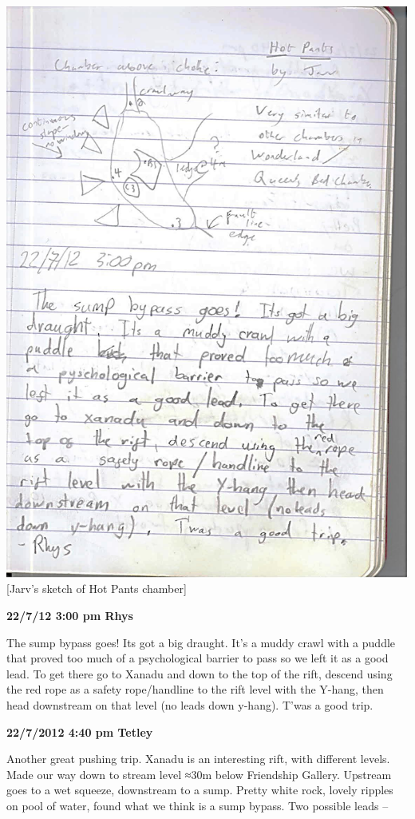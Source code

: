 \includegraphics{UgLog1012/70.jpeg}\\
{[}Jarv's sketch of Hot Pants chamber{]}

\textbf{22/7/12 3:00 pm Rhys}

The sump bypass goes! Its got a big draught. It's a muddy crawl with a
puddle that proved too much of a psychological barrier to pass so we
left it as a good lead. To get there go to Xanadu and down to the top of
the rift, descend using the red rope as a safety rope/handline to the
rift level with the Y-hang, then head downstream on that level (no leads
down y-hang). T'was a good trip.

\textbf{22/7/2012 4:40 pm Tetley}

Another great pushing trip. Xanadu is an interesting rift, with
different levels. Made our way down to stream level ≈30m below
Friendship Gallery. Upstream goes to a wet squeeze, downstream to a
sump. Pretty white rock, lovely ripples on pool of water, found what we
think is a sump bypass. Two possible leads --

